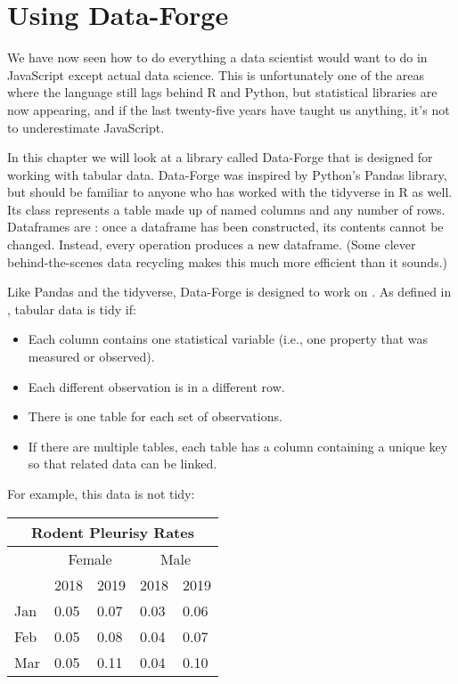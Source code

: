 \chapter{Using Data-Forge}\label{s:dataforge}

We have now seen how to do everything a data scientist would want to do in JavaScript
except actual data science.
This is unfortunately one of the areas where the language still lags behind R and Python,
but statistical libraries are now appearing,
and if the last twenty-five years have taught us anything,
it's not to underestimate JavaScript.

In this chapter we will look at a library called Data-Forge
that is designed for working with tabular data.
Data-Forge was inspired by Python's Pandas library,
but should be familiar to anyone who has worked with the tidyverse in R as well.
Its  class represents a table made up of named columns
and any number of rows.
Dataframes are :
once a dataframe has been constructed,
its contents cannot be changed.
Instead,
every operation produces a new dataframe.
(Some clever behind-the-scenes data recycling makes this much more efficient than it sounds.)

Like Pandas and the tidyverse,
Data-Forge is designed to work on .
As defined in \cite{Wick2014}, tabular data is tidy if:

\begin{itemize}
\item
  Each column contains one statistical variable
  (i.e., one property that was measured or observed).

\item
  Each different observation is in a different row.

\item
  There is one table for each set of observations.

\item
  If there are multiple tables,
  each table has a column containing a unique key
  so that related data can be linked.
\end{itemize}

For example,
this data is not tidy:

\begin{longtable}{|l|l|l|l|l|}
  \hline
  \multicolumn{5}{|c|}{Rodent Pleurisy Rates} \\
  \hline
  & \multicolumn{2}{c|}{Female} & \multicolumn{2}{c|}{Male} \\
  \hline
  & 2018 & 2019 & 2018 & 2019 \\
  \hline
  Jan & 0.05 & 0.07 & 0.03 & 0.06 \\
  \hline
  Feb & 0.05 & 0.08 & 0.04 & 0.07 \\
  \hline
  Mar & 0.05 & 0.11 & 0.04 & 0.10 \\
  \hline
\end{longtable}

